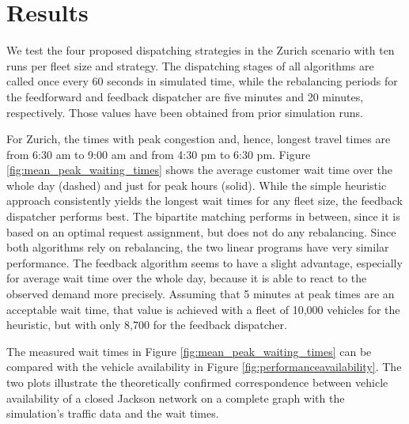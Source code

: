 \section{Results}
\label{sec:results}

We test the four proposed dispatching strategies in the Zurich scenario with ten
runs per fleet size and strategy. The dispatching stages of all algorithms are called once every 60 seconds in
simulated time, while the rebalancing periods for the feedforward and feedback
dispatcher are five minutes and 20 minutes, respectively. Those values have been
obtained from prior simulation runs.

For Zurich, the times with peak congestion and, hence, longest travel times
are from 6:30 am to 9:00 am and from 4:30 pm to 6:30 pm. Figure \ref{fig:mean_peak_waiting_times}
shows the average customer wait time over the whole day (dashed) and just for peak hours (solid).
While the simple heuristic approach consistently yields the longest wait times
for any fleet size, the feedback dispatcher performs best. The bipartite matching
performs in between, since it is based on an optimal request assignment, but does
not do any rebalancing. Since both algorithms rely on rebalancing, the two linear
programs have very similar performance. The feedback algorithm seems to have a
slight advantage, especially for average wait time over the whole day, because it
is able to react to the observed demand more precisely. Assuming that 5 minutes at
peak times are an acceptable wait time, that value is
achieved with a fleet of 10,000 vehicles for the heuristic, but with only 8,700
for the feedback dispatcher.

The measured wait times in Figure \ref{fig:mean_peak_waiting_times} can be compared
with the vehicle availability in Figure \ref{fig:performanceavailability}. The two plots illustrate the theoretically confirmed correspondence \cite{zhang2016control} between vehicle availability of a closed Jackson network on a complete graph with the simulation's traffic data and the wait times. 

\captionsetup[subfigure]{width=0.9\textwidth}

